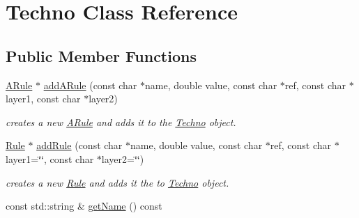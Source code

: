 \hypertarget{class_d_t_r_1_1_techno}{\section{Techno Class Reference}
\label{class_d_t_r_1_1_techno}
}
\subsection*{Public Member Functions}
\begin{DoxyCompactItemize}
\item 
\hyperlink{class_d_t_r_1_1_a_rule}{A\-Rule} $\ast$ \hyperlink{class_d_t_r_1_1_techno_a5f5a790974fe7d3b1c6f1b698ef0a818}{add\-A\-Rule} (const char $\ast$name, double value, const char $\ast$ref, const char $\ast$layer1, const char $\ast$layer2)
\begin{DoxyCompactList}\small\item\em creates a new \hyperlink{class_d_t_r_1_1_a_rule}{A\-Rule} and adds it to the \hyperlink{class_d_t_r_1_1_techno}{Techno} object. \end{DoxyCompactList}\item 
\hyperlink{class_d_t_r_1_1_rule}{Rule} $\ast$ \hyperlink{class_d_t_r_1_1_techno_afa2c8412c365c950649b9f81661ecafd}{add\-Rule} (const char $\ast$name, double value, const char $\ast$ref, const char $\ast$layer1=\char`\"{}\char`\"{}, const char $\ast$layer2=\char`\"{}\char`\"{})
\begin{DoxyCompactList}\small\item\em creates a new \hyperlink{class_d_t_r_1_1_rule}{Rule} and adds it the to \hyperlink{class_d_t_r_1_1_techno}{Techno} object. \end{DoxyCompactList}\item 
\hypertarget{class_d_t_r_1_1_techno_aef436e6e20d1dbf2eb78b089ca9d0794}{const std\-::string \& \hyperlink{class_d_t_r_1_1_techno_aef436e6e20d1dbf2eb78b089ca9d0794}{get\-Name} () const }\label{class_d_t_r_1_1_techno_aef436e6e20d1dbf2eb78b089ca9d0794}


\end{DoxyCompactItemize}
